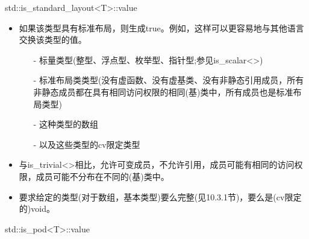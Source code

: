 std::is\_standard\_layout<T>::value

\begin{itemize}
\item 
如果该类型具有标准布局，则生成true。例如，这样可以更容易地与其他语言交换该类型的值。

\begin{itemize}
\item [-]
标量类型(整型、浮点型、枚举型、指针型;参见is\_scalar<>)

\item [-]
标准布局类类型(没有虚函数、没有虚基类、没有非静态引用成员，所有非静态成员都在具有相同访问权限的相同(基)类中，所有成员也是标准布局类型)

\item [-]
这种类型的数组

\item [-]
以及这些类型的cv限定类型
\end{itemize}

\item 
与is\_trivial<>相比，允许可变成员，不允许引用，成员可能有相同的访问权限，成员可能不分布在不同的(基)类中。

\item 
要求给定的类型(对于数组，基本类型)要么完整(见10.3.1节)，要么是(cv限定的)void。
\end{itemize}

std::is\_pod<T>::value

